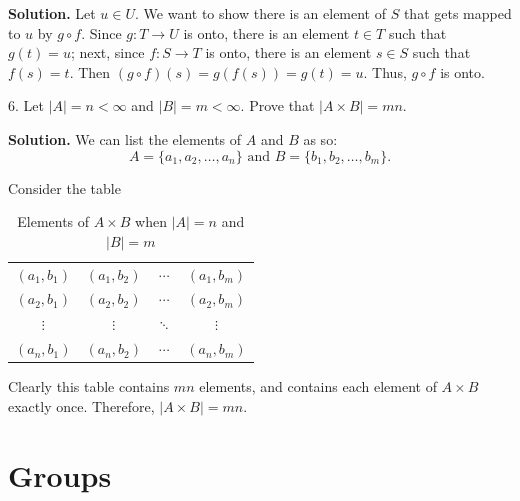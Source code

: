 \documentclass[10pt,]{book}
\theoremstyle{plain}
\theoremstyle{definition}
\theoremstyle{definition}
\theoremstyle{definition}
\theoremstyle{definition}
\numberwithin{equation}{section}
\newcommand{\lt}{<}
\begin{document}
\begin{exerciselist}
\noindent\textbf{Solution.}\hypertarget{solution-5}{}\quad
Let \(u\in U\). We want to show there is an element of \(S\) that gets mapped to \(u\) by \(g\circ f\). Since \(g:T\to U\) is onto, there is an element \(t\in T\) such that \(g(t)=u\); next, since \(f:S\to T\) is onto, there is an element \(s\in S\) such that \(f(s)=t\). Then \((g\circ f)(s)=g(f(s))=g(t)=u\). Thus, \(g\circ f\) is onto.%
\item[6.]\hypertarget{exercise-6}{}Let \(|A|=n\lt \infty\) and \(|B|=m\lt  \infty\). Prove that \(|A\times B|=mn\).%
\par\smallskip
\par\smallskip
\noindent\textbf{Solution.}\hypertarget{solution-6}{}\quad
We can list the elements of \(A\) and \(B\) as so:%
\begin{equation*}
A=\{a_1,a_2,\ldots, a_n\} \mbox{ and } B=\{b_1,b_2,\ldots, b_m\}.
\end{equation*}
%
\par
Consider the table%
\begin{table}
\centering
\begin{tabular}{cccc}
\((a_1,b_1)\)&\((a_1,b_2)\)&\(\cdots\)&\((a_1,b_m)\)\tabularnewline[0pt]
\((a_2,b_1)\)&\((a_2,b_2)\)&\(\cdots\)&\((a_2,b_m)\)\tabularnewline[0pt]
\(\vdots\)&\(\vdots\)&\(\ddots\)&\(\vdots\)\tabularnewline[0pt]
\((a_n,b_1)\)&\((a_n,b_2)\)&\(\cdots\)&\((a_n,b_m)\)
\end{tabular}
\caption{Elements of \(A\times B\) when \(|A|=n\) and \(|B|=m\)\label{cardmn}}
\end{table}
Clearly this table contains \(mn\) elements, and contains each element of \(A\times B\) exactly once. Therefore, \(|A\times B|=mn\).%
\end{exerciselist}
\typeout{************************************************}
\typeout{************************************************}
\chapter[{Groups}]{Groups}\label{gps}
\typeout{************************************************}
\typeout{************************************************}
\end{document}
